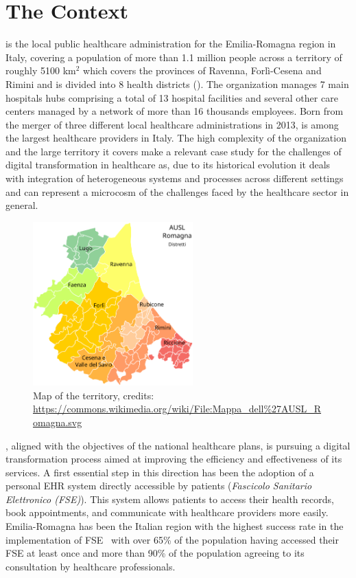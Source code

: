 \section{The \ausl{} Context}

\auslLong{} is the local public healthcare administration for the Emilia-Romagna region in Italy, covering a population of more than 1.1 million people across a territory of roughly 5100 km$^2$ which covers the provinces of Ravenna, Forlì-Cesena and Rimini and is divided into 8 health districts ().
%
The organization manages 7 main hospitals hubs comprising a total of 13 hospital facilities and several other care centers managed by a network of more than 16 thousands employees. 
%
Born from the merger of three different local healthcare administrations in 2013, \ausl{} is among the largest healthcare providers in Italy.
%
The high complexity of the organization and the large territory it covers make \ausl{} a relevant case study for the challenges of digital transformation in healthcare as, due to its historical evolution it deals with integration of heterogeneous systems and processes across different settings and can represent a microcosm of the challenges faced by the healthcare sector in general.


\begin{figure}[t]
    \centering
    \includegraphics[width=0.55\textwidth]{figures/mappa_ausl.png} 
    \caption{
        Map of the \ausl{} territory, credits:
        \url{https://commons.wikimedia.org/wiki/File:Mappa_dell\%27AUSL_Romagna.svg}
    }
    \label{fig:ausl-map}
\end{figure}


\ausl{}, aligned with the objectives of the national healthcare plans, is pursuing a digital transformation process aimed at improving the efficiency and effectiveness of its services.
%
A first essential step in this direction has been the adoption of a personal \ac{EHR} system directly accessible by patients (\emph{Fascicolo Sanitario Elettronico (FSE)}).
This system allows patients to access their health records, book appointments, and communicate with healthcare providers more easily. 
%
Emilia-Romagna has been the Italian region with the highest success rate in the implementation of FSE~\cite{fse_ausl_prima} with over 65\% of the population having accessed their FSE at least once and more than 90\% of the population agreeing to its consultation by healthcare professionals.

